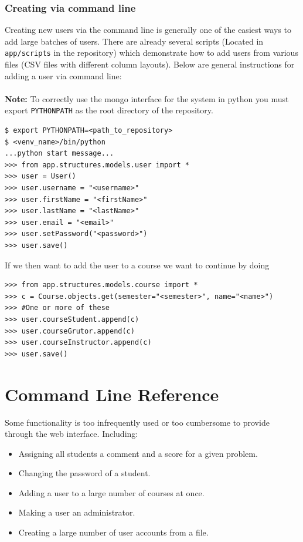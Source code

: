 \documentclass[11pt]{report}
\begin{document}
\subsection{Creating via command line}
Creating new users via the command line is generally one of the easiest ways to add large batches of users.
There are already several scripts (Located in \verb|app/scripts| in the repository) which demonstrate how to
add users from various files (CSV files with different column layouts). Below are general instructions for adding
a user via command line:
\\
\\
\noindent\textbf{Note:} To correctly use the mongo interface for the system in python you must export \verb|PYTHONPATH| as the root directory of the repository.

\begin{verbatim}
$ export PYTHONPATH=<path_to_repository>
$ <venv_name>/bin/python
...python start message...
>>> from app.structures.models.user import *
>>> user = User()
>>> user.username = "<username>"
>>> user.firstName = "<firstName>"
>>> user.lastName = "<lastName>"
>>> user.email = "<email>"
>>> user.setPassword("<password>")
>>> user.save()
\end{verbatim}

\noindent If we then want to add the user to a course we want to continue by doing

\begin{verbatim}
>>> from app.structures.models.course import *
>>> c = Course.objects.get(semester="<semester>", name="<name>")
>>> #One or more of these
>>> user.courseStudent.append(c)
>>> user.courseGrutor.append(c)
>>> user.courseInstructor.append(c)
>>> user.save()
\end{verbatim}


\chapter{Command Line Reference}
Some functionality is too infrequently used or too cumbersome to provide through
the web interface. Including:

\begin{itemize}
  \item Assigning all students a comment and a score for a given problem.
  \item Changing the password of a student.
  \item Adding a user to a large number of courses at once.
  \item Making a user an administrator.
  \item Creating a large number of user accounts from a file.
\end{itemize}
\end{document}
